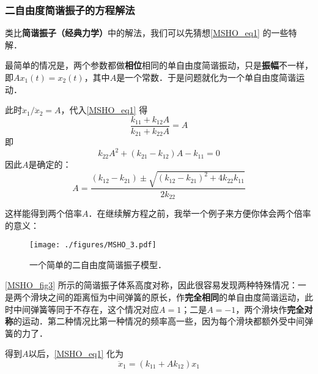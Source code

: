 \subsubsection{二自由度简谐振子的方程解法}

类比\textbf{简谐振子（经典力学）}中的解法，我们可以先猜想\autoref{MSHO_eq1} 的一些特解．

最简单的情况是，两个参数都做\textbf{相位}相同的单自由度简谐振动，只是\textbf{振幅}不一样，即$Ax_1(t) = x_2(t)$，其中$A$是一个常数．于是问题就化为一个单自由度简谐运动．

此时${\ddot{x}_1}/{\ddot{x}_2}=A$，代入\autoref{MSHO_eq1} 得
\begin{equation}
\frac{k_{11}+k_{12}A}{k_{21}+k_{22}A}=A
\end{equation}
即
\begin{equation}
k_{22}A^2+(k_{21}-k_{12})A-k_{11} = 0
\end{equation}
因此$A$是确定的：
\begin{equation}
A = \frac{(k_{12}-k_{21})\pm\sqrt{(k_{12}-k_{21})^2 + 4k_{22}k_{11}}}{2k_{22}}
\end{equation}

这样能得到两个倍率$A$．在继续解方程之前，我举一个例子来方便你体会两个倍率的意义：
\begin{figure}[ht]
\centering
\texttt{[image: ./figures/MSHO\_3.pdf]}
\caption{一个简单的二自由度简谐振子模型．} \label{MSHO_fig3}
\end{figure}

\autoref{MSHO_fig3} 所示的简谐振子体系高度对称，因此很容易发现两种特殊情况：一是两个滑块之间的距离恒为中间弹簧的原长，作\textbf{完全相同}的单自由度简谐运动，此时中间弹簧等同于不存在，这个情况对应$A=1$；二是$A=-1$，两个滑块作\textbf{完全对称}的运动．第二种情况比第一种情况的频率高一些，因为每个滑块都额外受中间弹簧的力了．

得到$A$以后，\autoref{MSHO_eq1} 化为
\begin{equation}
\ddot{x}_1 = (k_{11}+Ak_{12})x_1
\end{equation}









